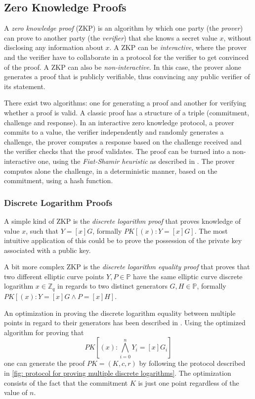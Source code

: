 \clearpage
\subsection{Zero Knowledge Proofs}
A \textit{zero knowledge proof} (ZKP) is an algorithm by which one party (the \textit{prover}) can prove to another party (the \textit{verifier}) that she knows a secret value $x$, without disclosing any information about $x$. A ZKP can be \textit{interactive}, where the prover and the verifier have to collaborate in a protocol for the verifier to get convinced of the proof. A ZKP can also be \textit{non-interactive}. In this case, the prover alone generates a proof that is publicly verifiable, thus convincing any public verifier of its statement. 

There exist two algorithms: one for generating a proof and another for verifying whether a proof is valid. A classic proof has a structure of a triple (commitment, challenge and response). In an interactive zero knowledge protocol, a prover commits to a value, the verifier independently and randomly generates a challenge, the prover computes a response based on the challenge received and the verifier checks that the proof validates. The proof can be turned into a non-interactive one, using the \textit{Fiat-Shamir heuristic} as described in \cite{Fiat87}. The prover computes alone the challenge, in a deterministic manner, based on the commitment, using a hash function.


\subsubsection{Discrete Logarithm Proofs} \label{app: discrete logarithm proofs}
A simple kind of ZKP is the \textit{discrete logarithm proof} that proves knowledge of value $x$, such that $Y = [x]G$, formally $PK[(x) : Y = [x]G]$. The most intuitive application of this could be to prove the possession of the private key associated with a public key.

A bit more complex ZKP is the \textit{discrete logarithm equality proof} that proves that two different elliptic curve points $Y, P \in \mathbb{P}$ have the same elliptic curve discrete logarithm $x \in \mathbb{Z}_q$ in regards to two distinct generators $G, H \in \mathbb{P}$, formally $PK[(x) : Y = [x]G \wedge P = [x]H]$.

An optimization in proving the discrete logarithm equality between multiple points in regard to their generators has been described in \cite{Chow10}. Using the optimized algorithm for proving that
\[ PK[(x) : \bigwedge_{i=0}^{n} Y_i = [x]G_i] \]
one can generate the proof $PK = (K, c, r)$ by following the protocol described in \cref{fig: protocol for proving multiple discrete logarithms}. The optimization consists of the fact that the commitment $K$ is just one point regardless of the value of $n$.


